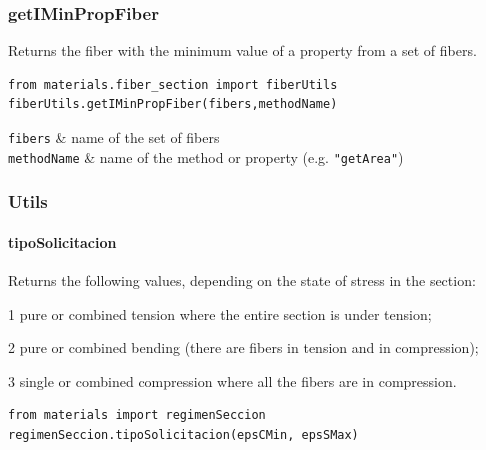 \subsubsection{getIMinPropFiber}
Returns the fiber with the minimum value of a property from a set of fibers.
\noindent 
\begin{verbatim}
from materials.fiber_section import fiberUtils
fiberUtils.getIMinPropFiber(fibers,methodName)
\end{verbatim}
\begin{paramFuncTable}
{\tt fibers} & name of the set of fibers \\
{\tt methodName} & name of the method or property (e.g. {\tt "getArea"}) \\
\end{paramFuncTable}



\subsubsection{Utils}
\paragraph{tipoSolicitacion}
\noindent Returns the following values, depending on the state of stress in the section:
\begin{description}
\item{1} pure or combined tension where the entire section is under tension;
\item{2} pure or combined bending (there are fibers in tension and in compression);
\item{3} single or combined compression where all the fibers are in compression.
\end{description}
\begin{verbatim}
from materials import regimenSeccion
regimenSeccion.tipoSolicitacion(epsCMin, epsSMax)
\end{verbatim}
\begin{paramFuncTable}
\epsCMin{}\\
\epsSMax{}\\
\end{paramFuncTable}


